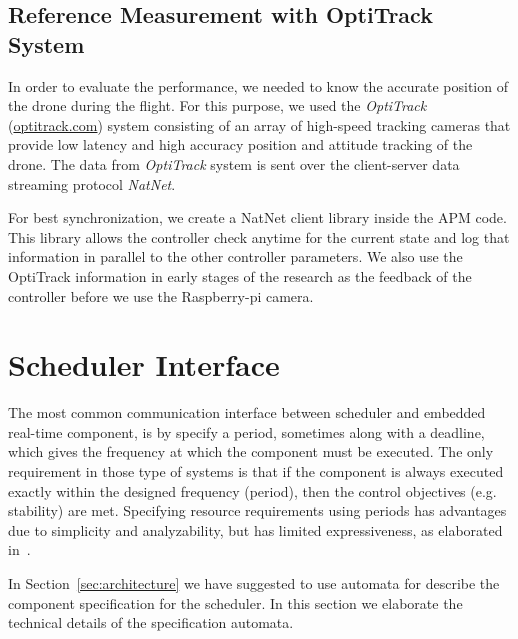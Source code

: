 \documentclass[ twoside, 12pt ]{article}
\begin{document}
\subsection{Reference Measurement with OptiTrack System}
In order to evaluate the performance, we needed to know the accurate position of the drone during the flight. For this purpose, we used the \textit{OptiTrack} (\url{optitrack.com}) system 
consisting of an array of high-speed tracking cameras that provide low latency and high accuracy position and attitude tracking of the drone. The data from \textit{OptiTrack} system is sent over the client-server data streaming protocol \textit{NatNet}.

For best synchronization, we create a NatNet client library inside the APM code. This library allows the controller check anytime for the current state and log that information in parallel to the other controller parameters.
We also use the OptiTrack information in early stages of the research as the feedback of the controller before we use the Raspberry-pi camera.

\section{Scheduler Interface}
\label{sec:scheduler}

The most common communication interface between scheduler and embedded real-time component, is by specify a period, sometimes along with a deadline, which gives the frequency at which the component must be executed.
The only requirement in those type of systems is that if the component is always executed exactly within the designed frequency (period), then the control objectives (e.g. stability) are met.
Specifying resource requirements using periods has advantages due to simplicity and analyzability, but has limited expressiveness, as elaborated in~\cite{RTComposer}. 

In Section~\ref{sec:architecture} we have suggested to use automata for describe the component specification for the scheduler. In this section we elaborate the technical details of the specification automata.
\end{document}
